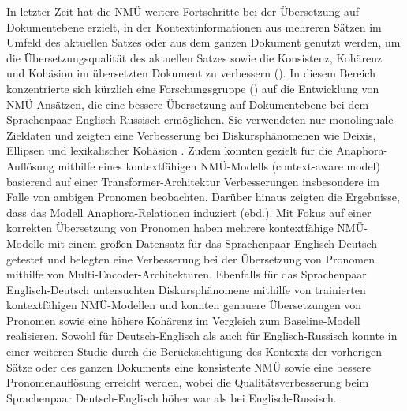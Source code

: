 In letzter Zeit hat die NMÜ weitere Fortschritte bei der Übersetzung auf Dokumentebene erzielt, in der Kontextinformationen aus mehreren Sätzen im Umfeld des aktuellen Satzes oder aus dem ganzen Dokument genutzt werden, um die Übersetzungsqualität des aktuellen Satzes sowie die Konsistenz, Kohärenz und Kohäsion im übersetzten Dokument zu verbessern (\citealt{ZhangZong2020}). In diesem Bereich konzentrierte sich kürzlich eine Forschungsgruppe (\citealt{VoitaEtAl2018,VoitaEtAl2019}) auf die Entwicklung von NMÜ-Ansätzen, die eine bessere Übersetzung auf Dokumentebene bei dem Sprachenpaar Englisch-Russisch ermöglichen. Sie verwendeten nur monolinguale Zieldaten und zeigten eine Verbesserung bei Diskursphänomenen wie Deixis, Ellipsen und lexikalischer Kohäsion \citep{VoitaEtAl2019}. Zudem konnten \citet{VoitaEtAl2018} gezielt für die Anaphora-Auflösung mithilfe eines kontextfähigen NMÜ-Modells (context-aware model) basierend auf einer Transformer-Architektur Verbesserungen insbesondere im Falle von ambigen Pronomen beobachten. Darüber hinaus zeigten die Ergebnisse, dass das Modell Anaphora-Relationen induziert (ebd.). Mit Fokus auf einer korrekten Übersetzung von Pronomen haben \citet{MüllerEtAl2018} mehrere kontextfähige NMÜ-Modelle mit einem großen Datensatz für das Sprachenpaar Englisch-Deutsch getestet und belegten eine Verbesserung bei der Übersetzung von Pronomen mithilfe von Multi-Encoder-Architekturen. Ebenfalls für das Sprachenpaar Englisch-Deutsch untersuchten \citet{StojanovskiFraser2018, StojanovskiFraser2019} Diskursphänomene mithilfe von trainierten kontextfähigen NMÜ-Modellen und konnten genauere Übersetzungen von Pronomen sowie eine höhere Kohärenz im Vergleich zum Baseline-Modell realisieren. Sowohl für Deutsch-Englisch als auch für Englisch-Russisch konnte in einer weiteren Studie \citep{Matusov2019} durch die Berücksichtigung des Kontexts der vorherigen Sätze oder des ganzen Dokuments eine konsistente NMÜ sowie eine bessere Pronomenauflösung erreicht werden, wobei die Qualitätsverbesserung beim Sprachenpaar Deutsch-Englisch höher war als bei Englisch-Russisch.

